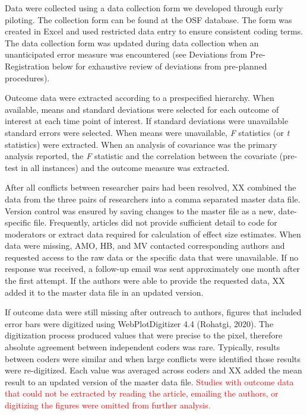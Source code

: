 \documentclass[
  english,
  man, donotrepeattitle,mask,floatsintext]{apa7}
\begin{document}
Data were collected using a data collection form we developed through early piloting. The collection form can be found at the OSF database. The form was created in Excel and used restricted data entry to ensure consistent coding terms. The data collection form was updated during data collection when an unanticipated error measure was encountered (see Deviations from Pre-Registration below for exhaustive review of deviations from pre-planned procedures).

Outcome data were extracted according to a prespecified hierarchy. When available, means and standard deviations were selected for each outcome of interest at each time point of interest. If standard deviations were unavailable standard errors were selected. When means were unavailable, \emph{F} statistics (or \emph{t} statistics) were extracted. When an analysis of covariance was the primary analysis reported, the \emph{F} statistic and the correlation between the covariate (pre-test in all instances) and the outcome measure was extracted.

After all conflicts between researcher pairs had been resolved, XX combined the data from the three pairs of researchers into a comma separated master data file. Version control was ensured by saving changes to the master file as a new, date-specific file. Frequently, articles did not provide sufficient detail to code for moderators or extract data required for calculation of effect size estimates. When data were missing, AMO, HB, and MV contacted corresponding authors and requested access to the raw data or the specific data that were unavailable. If no response was received, a follow-up email was sent approximately one month after the first attempt. If the authors were able to provide the requested data, XX added it to the master data file in an updated version.

If outcome data were still missing after outreach to authors, figures that included error bars were digitized using WebPlotDigitizer 4.4 (Rohatgi, 2020). The digitization process produced values that were precise to the pixel, therefore absolute agreement between independent coders was rare. Typically, results between coders were similar and when large conflicts were identified those results were re-digitized. Each value was averaged across coders and XX added the mean result to an updated version of the master data file. \textcolor{red}{Studies with outcome data that could not be extracted by reading the article, emailing the authors, or digitizing the figures were omitted from further analysis.}
\end{document}
